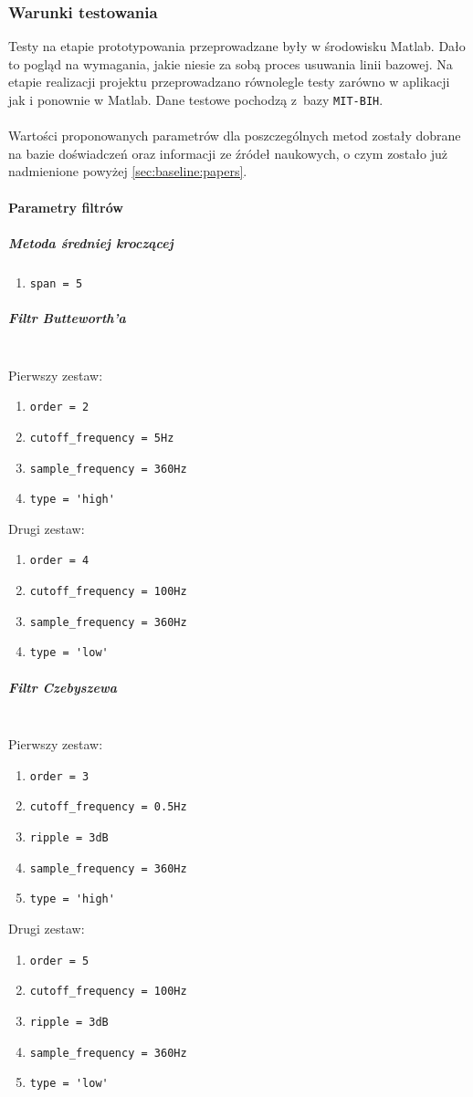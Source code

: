 \documentclass[a4paper, 11pt]{article}
\begin{document}
\subsubsection{Warunki testowania}
\label{sec:baseline:tests}
Testy na etapie prototypowania przeprowadzane były w środowisku Matlab. Dało to pogląd na wymagania, jakie niesie za sobą proces usuwania linii bazowej. Na etapie realizacji projektu przeprowadzano równolegle testy zarówno w aplikacji jak i ponownie w Matlab. Dane testowe pochodzą z~bazy \verb|MIT-BIH|.\\\\
Wartości proponowanych parametrów dla poszczególnych metod zostały dobrane na bazie doświadczeń oraz informacji ze źródeł naukowych, o czym zostało już nadmienione powyżej \ref{sec:baseline:papers}.\\

\paragraph{Parametry filtrów}
\subparagraph{Metoda średniej kroczącej}
\begin{enumerate}
\item \verb|span = 5|
\end{enumerate}

\subparagraph{Filtr Butteworth'a}
\mbox{} \\
Pierwszy zestaw:
\begin{enumerate}
\item \verb|order = 2|
\item \verb|cutoff_frequency = 5Hz|
\item \verb|sample_frequency = 360Hz|
\item \verb|type = 'high'|
\end{enumerate}
Drugi zestaw:
\begin{enumerate}
\item \verb|order = 4|
\item \verb|cutoff_frequency = 100Hz|
\item \verb|sample_frequency = 360Hz|
\item \verb|type = 'low'|
\end{enumerate}

\subparagraph{Filtr Czebyszewa}
\mbox{} \\
Pierwszy zestaw:
\begin{enumerate}
\item \verb|order = 3|
\item \verb|cutoff_frequency = 0.5Hz|
\item \verb|ripple = 3dB|
\item \verb|sample_frequency = 360Hz|
\item \verb|type = 'high'|
\end{enumerate}
Drugi zestaw:
\begin{enumerate}
\item \verb|order = 5|
\item \verb|cutoff_frequency = 100Hz|
\item \verb|ripple = 3dB|
\item \verb|sample_frequency = 360Hz|
\item \verb|type = 'low'|
\end{enumerate}
\end{document}
